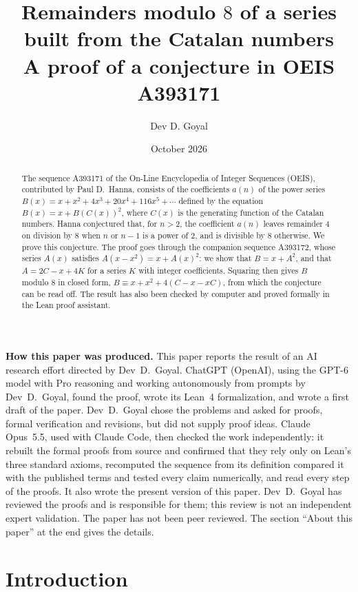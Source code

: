 \documentclass[11pt,a4paper]{article}
\title{Remainders modulo $8$ of a series built from the Catalan numbers\\[6pt]\large A proof of a conjecture in OEIS A393171}
\author{Dev D. Goyal}
\date{October 2026}
\theoremstyle{definition}
\theoremstyle{remark}
\begin{document}
\maketitle
\begin{abstract}
The sequence A393171 of the On-Line Encyclopedia of Integer Sequences (OEIS), contributed by Paul D.~Hanna, consists of
the coefficients $a(n)$ of the power series $B(x)=x+x^2+4x^3+20x^4+116x^5+\cdots$ defined by the equation
$B(x)=x+B(C(x))^2$, where $C(x)$ is the generating function of the Catalan numbers. Hanna conjectured that, for
$n>2$, the coefficient $a(n)$ leaves remainder $4$ on division by $8$ when $n$ or $n-1$ is a power of $2$, and is
divisible by $8$ otherwise. We prove this conjecture. The proof goes through the companion sequence A393172, whose
series $A(x)$ satisfies $A(x-x^2)=x+A(x)^2$: we show that $B=x+A^2$, and that $A=2C-x+4K$ for a series $K$ with integer
coefficients. Squaring then gives $B$ modulo $8$ in closed form, $B\equiv x+x^2+4(C-x-xC)$, from which the conjecture
can be read off. The result has also been checked by computer and proved formally in the Lean proof assistant.
\end{abstract}
\begin{center}\begin{minipage}{0.88\linewidth}\small
\textbf{How this paper was produced.} This paper reports the result of an AI research effort directed by
Dev~D.~Goyal. ChatGPT (OpenAI), using the GPT-6 model with Pro reasoning and working autonomously from prompts by
Dev~D.~Goyal, found the proof, wrote its Lean~4 formalization, and wrote a first draft of the paper.
Dev~D.~Goyal chose the problems and asked for proofs, formal verification and revisions, but did not supply proof
ideas. Claude Opus~5.5, used with Claude Code, then checked the work independently: it rebuilt the formal proofs from
source and confirmed that they rely only on Lean's three standard axioms, recomputed the sequence from its definition
compared it with the published terms and tested every claim numerically, and read every step of the proofs. It also wrote the present
version of this paper.
Dev~D.~Goyal has reviewed the proofs and is responsible for them; this review is not an independent expert validation.
The paper has not been peer reviewed.
The section ``About this paper'' at the end gives the details.
\end{minipage}\end{center}

\section{Introduction}
\end{document}
